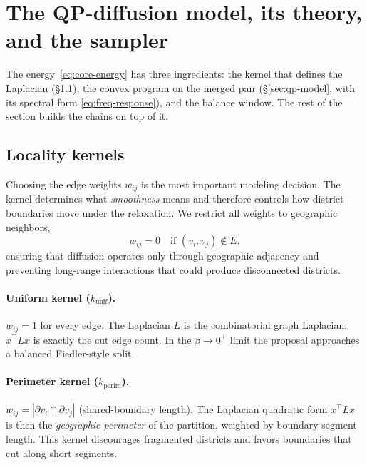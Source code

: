 \documentclass[11pt]{article}
\begin{document}
\section{The QP-diffusion model, its theory, and the sampler}\label{sec:model}

The energy~\eqref{eq:core-energy} has three ingredients: the kernel
that defines the Laplacian (\S\ref{sec:kernels}), the convex program
on the merged pair (\S\ref{sec:qp-model}, with its spectral form
\eqref{eq:freq-response}), and the balance window. The rest of the
section builds the chains on top of it.

\subsection{Locality kernels}\label{sec:kernels}

Choosing the edge weights $w_{ij}$ is the most important modeling
decision. The kernel determines what \emph{smoothness} means and
therefore controls how district boundaries move under the relaxation.
We restrict all weights to geographic neighbors,
\begin{equation}\label{eq:kernel-local}
  w_{ij} = 0 \quad \text{if } (v_i, v_j) \notin E,
\end{equation}
ensuring that diffusion operates only through geographic adjacency and
preventing long-range interactions that could produce disconnected
districts.

\paragraph{Uniform kernel ($k_{\mathrm{unif}}$).} $w_{ij} = 1$ for
every edge. The Laplacian $L$ is the combinatorial graph Laplacian;
$x^\top L x$ is exactly the cut edge count. In the $\beta \to 0^+$
limit the proposal approaches a balanced Fiedler-style split.

\paragraph{Perimeter kernel ($k_{\mathrm{perim}}$).} $w_{ij} = |\partial v_i \cap \partial v_j|$
(shared-boundary length). The Laplacian quadratic form $x^\top L x$
is then the \emph{geographic perimeter} of the partition, weighted by
boundary segment length. This kernel discourages fragmented districts
and favors boundaries that cut along short segments.
\end{document}
